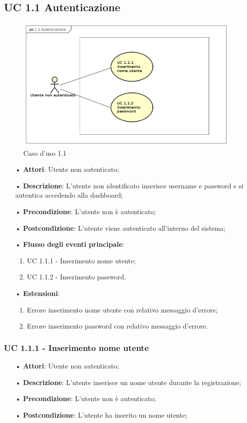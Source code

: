 \subsection{UC 1.1 Autenticazione}
\begin{figure}[H]
\centering
\includegraphics[width=17cm]{img/UC11.png} 
\caption{Caso d'uso 1.1}\label{fig:11}
\end{figure}
\begin{itemize}
\item[•]\textbf{Attori}: Utente non autenticato;
\item[•]\textbf{Descrizione}:  L’utente non identificato inserisce username e password e si autentica accedendo alla dashboard;
\item[•]\textbf{Precondizione}: L’utente non è autenticato;
\item[•]\textbf{Postcondizione}: L’utente viene autenticato all’interno del sistema;
\item[•]\textbf{Flusso degli eventi principale}:
\begin{enumerate}
\item UC 1.1.1 - Inserimento nome utente;
\item UC 1.1.2 - Inserimento password.
\end{enumerate}
\item[•]\textbf{Estensioni}:
\begin{enumerate}
\item Errore inserimento nome utente con relativo messaggio d’errore;
\item Errore inserimento password con relativo messaggio d’errore.
\end{enumerate}
\end{itemize}

\subsubsection{UC 1.1.1 - Inserimento nome utente}
\begin{itemize}
\item[•]\textbf{Attori}: Utente non autenticato;
\item[•]\textbf{Descrizione}: L’utente inserisce un nome utente durante la registrazione;
\item[•]\textbf{Precondizione}: L’utente non è autenticato;
\item[•]\textbf{Postcondizione}: L’utente ha inserito un nome utente;
\end{itemize}

